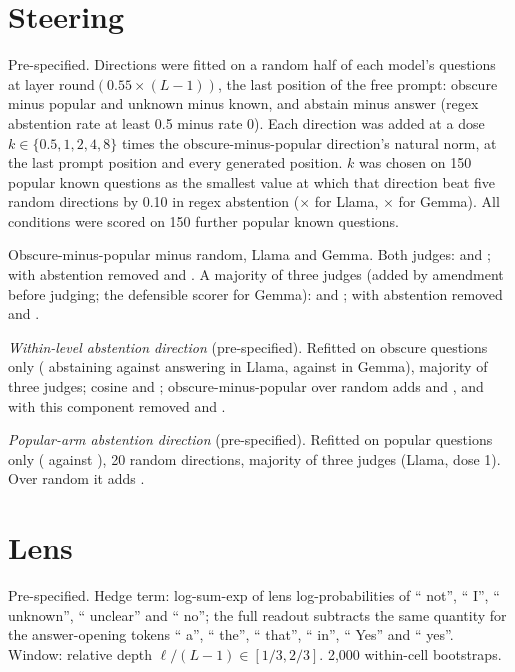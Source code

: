 \documentclass[manuscript,screen,review,anonymous,nonacm]{acmart}
\begin{document}
\section{Steering}
\label{app:steer}

Pre-specified. Directions were fitted on a random half of each model's questions at layer round$(0.55\times(L-1))$, the last position of the free prompt: obscure minus popular and unknown minus known, and abstain minus answer (regex abstention rate at least 0.5 minus rate 0). Each direction was added at a dose $k\in\{0.5,1,2,4,8\}$ times the obscure-minus-popular direction's natural norm, at the last prompt position and every generated position. $k$ was chosen on 150 popular known questions as the smallest value at which that direction beat five random directions by 0.10 in regex abstention (\svLlamaDose$\times$ for Llama, \svGemmaDose$\times$ for Gemma). All conditions were scored on 150 further popular known questions.

Obscure-minus-popular minus random, Llama and Gemma. Both judges: \svLlamaDOne{} \svLlamaDOneCI{} and \svGemmaDOne{} \svGemmaDOneCI; with abstention removed \svLlamaDTwo{} \svLlamaDTwoCI{} and \svGemmaDTwo{} \svGemmaDTwoCI. A majority of three judges (added by amendment before judging; the defensible scorer for Gemma): \svLlamaMajDOne{} \svLlamaMajDOneCI{} and \svGemmaMajDOne{} \svGemmaMajDOneCI; with abstention removed \svLlamaMajDTwo{} \svLlamaMajDTwoCI{} and \svGemmaMajDTwo{} \svGemmaMajDTwoCI.

\emph{Within-level abstention direction} (pre-specified). Refitted on obscure questions only (\wlLlamaHi{} abstaining against \wlLlamaLo{} answering in Llama, \wlGemmaHi{} against \wlGemmaLo{} in Gemma), majority of three judges; cosine \wlLlamaCos{} and \wlGemmaCos; obscure-minus-popular over random adds \wlLlamaDOne{} \wlLlamaDOneCI{} and \wlGemmaDOne{} \wlGemmaDOneCI, and with this component removed \wlLlamaDTwo{} \wlLlamaDTwoCI{} and \wlGemmaDTwo{} \wlGemmaDTwoCI.

\emph{Popular-arm abstention direction} (pre-specified). Refitted on popular questions only (\gaHi{} against \gaLo), 20 random directions, majority of three judges (Llama, dose 1). Over random it adds \gaAbst{} \gaAbstCI.

\section{Lens}
\label{app:lens}

Pre-specified. Hedge term: log-sum-exp of lens log-probabilities of `` not'', `` I'', `` unknown'', `` unclear'' and `` no''; the full readout subtracts the same quantity for the answer-opening tokens `` a'', `` the'', `` that'', `` in'', `` Yes'' and `` yes''. Window: relative depth $\ell/(L-1)\in[1/3,2/3]$. 2,000 within-cell bootstraps.
\end{document}
